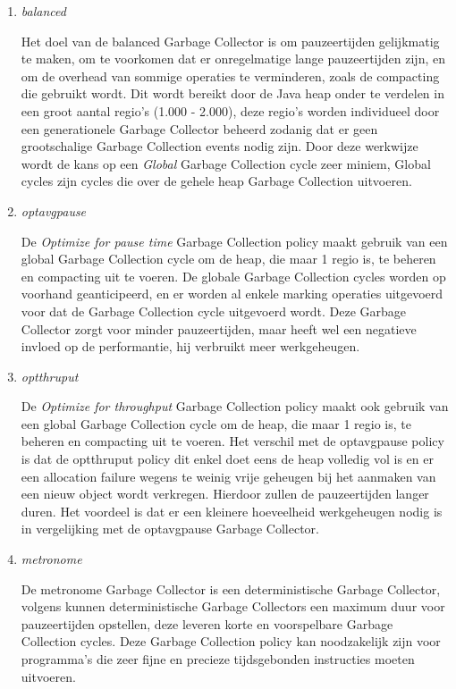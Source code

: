 \begin{enumerate}
    \item \textit{balanced}
    
            Het doel van de balanced Garbage Collector is om pauzeertijden gelijkmatig te maken, om te voorkomen dat er onregelmatige lange pauzeertijden zijn, en om de overhead van sommige operaties te verminderen, zoals de compacting die gebruikt wordt.
            Dit wordt bereikt door de Java heap onder te verdelen in een groot aantal regio's (1.000 - 2.000), deze regio's worden individueel door een generationele Garbage Collector beheerd zodanig dat er geen grootschalige Garbage Collection events nodig zijn.
            Door deze werkwijze wordt de kans op een \textit{Global} Garbage Collection cycle zeer miniem, Global cycles zijn cycles die over de gehele heap Garbage Collection uitvoeren.


    \item \textit{optavgpause}   
    
            De \textit{Optimize for pause time} Garbage Collection policy maakt gebruik van een global Garbage Collection cycle om de heap, die maar 1 regio is, te beheren en compacting uit te voeren.
            De globale Garbage Collection cycles worden op voorhand geanticipeerd, en er worden al enkele marking operaties uitgevoerd voor dat de Garbage Collection cycle uitgevoerd wordt.
            Deze Garbage Collector zorgt voor minder pauzeertijden, maar heeft wel een negatieve invloed op de performantie, hij verbruikt meer werkgeheugen.

    \item \textit{optthruput}
    
            De \textit{Optimize for throughput} Garbage Collection policy maakt ook gebruik van een global Garbage Collection cycle om de heap, die maar 1 regio is, te beheren en compacting uit te voeren.
            Het verschil met de optavgpause policy is dat de optthruput policy dit enkel doet eens de heap volledig vol is en er een allocation failure wegens te weinig vrije geheugen bij het aanmaken van een nieuw object wordt verkregen.
            Hierdoor zullen de pauzeertijden langer duren.
            Het voordeel is dat er een kleinere hoeveelheid werkgeheugen nodig is in vergelijking met de optavgpause Garbage Collector.
    \item \textit{metronome}
    
            De metronome Garbage Collector is een deterministische Garbage Collector, volgens \textcite{Oracle2008} kunnen deterministische Garbage Collectors een maximum duur voor pauzeertijden opstellen, deze leveren korte en voorspelbare Garbage Collection cycles.
            Deze Garbage Collection policy kan noodzakelijk zijn voor programma's die zeer fijne en precieze tijdsgebonden instructies moeten uitvoeren.
            

\end{enumerate}
